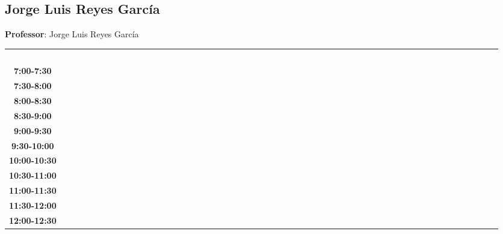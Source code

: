 \documentclass{article}
\begin{document}
        \newpage
        

        \subsection{Jorge Luis Reyes Garc\'ia}
        \vspace*{.1cm}
        
        \begin{flushright}
            {\LARGE \textbf{Professor}: Jorge Luis Reyes Garc\'ia}
        \end{flushright}
        \vspace{1cm}

        \begin{table}[ht]\centering\small\begin{tabular}{|c|c|c|c|c|c|c|c|c|c|c|c|c|c|c|c|c|c|c|c|c|c|c|c|c|c|c|c|c|c|}\hline\cellcolor{black}\textcolor{white}{Horas} & \cellcolor{black}\textcolor{white}{Lunes} & \cellcolor{black}\textcolor{white}{Martes} & \cellcolor{black}\textcolor{white}{Mi\'ercoles} & \cellcolor{black}\textcolor{white}{Jueves} & \cellcolor{black}\textcolor{white}{Viernes} & \cellcolor{black}\textcolor{white}{S\'abado} & \cellcolor{black}\textcolor{white}{Domingo} \\
 \cline{1-8} 
\textbf{7:00-7:30} &   &   &   &   &   &   &   \\
 \cline{1-8} 
\textbf{7:30-8:00} &   &   &   &   &   &   &   \\
 \cline{1-8} 
\textbf{8:00-8:30} &   &   &   &   &   &   &   \\
 \cline{1-8} 
\textbf{8:30-9:00} &   &   &   &   &   &   &   \\
 \cline{1-8} 
\textbf{9:00-9:30} &   &   &   &   &   &   &   \\
 \cline{1-8} 
\textbf{9:30-10:00} &   &   &   &   &   &   &   \\
 \cline{1-8} 
\textbf{10:00-10:30} &   &   &   &   &   & \cellcolor[RGB]{176,77,202} &   \\
 \cline{1-6} \cline{8-8} 
\textbf{10:30-11:00} &   &   &   &   &   & \cellcolor[RGB]{176,77,202} &   \\
 \cline{1-6} \cline{8-8} 
\textbf{11:00-11:30} &   &   &   &   &   & \cellcolor[RGB]{176,77,202} &   \\
 \cline{1-6} \cline{8-8} 
\textbf{11:30-12:00} &   &   &   &   &   & \cellcolor[RGB]{176,77,202} &   \\
 \cline{1-6} \cline{8-8} 
\textbf{12:00-12:30} &   &   &   &   &   & \cellcolor[RGB]{176,77,202} &   \\

\end{tabular}
\end{table}
\end{document}
